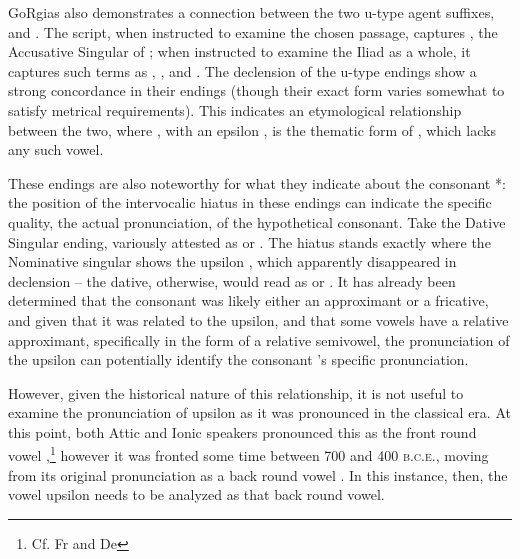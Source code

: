 

GoRgias also demonstrates a connection between the two
u-type agent suffixes,  and . The script, when
instructed to examine the chosen passage, captures , the
Accusative Singular of ; when instructed to examine the
Iliad as a whole, it captures such terms as ,
, and . The declension of the u-type
endings show a strong concordance in their endings (though
their exact form varies somewhat to satisfy metrical requirements).
This indicates an etymological relationship between the two, where
, with an epsilon , is the
thematic form of , which lacks any such vowel. 



These endings are also noteworthy for what they indicate about the
consonant *\w: the position of the intervocalic hiatus in these
endings can indicate the specific quality, the actual pronunciation,
of the hypothetical consonant.
Take the Dative Singular ending, variously attested as 
or . The hiatus stands exactly where the Nominative
singular shows the upsilon , which apparently
disappeared in declension -- the dative, otherwise, would read as
 or . It has already been determined
that the consonant was likely either an approximant or a fricative,
and given that it was related to the upsilon, and that some vowels
have a relative approximant, specifically in the form of a relative
semivowel, the pronunciation of the upsilon
can potentially identify the consonant \w's specific pronunciation.

However, given the historical nature of this relationship, it is not
useful to examine the pronunciation of upsilon  as it was
pronounced in the classical era. At this point, both Attic and
Ionic speakers pronounced this as the front round vowel ,\footnote{Cf. Fr  and De } however it
was fronted some time between 700 and 400 \textsc{b.c.e.}, moving
from its original pronunciation as a back round vowel .\autocite[529]{malikouti-drachman_bortone_2015}
In this instance, then, the vowel upsilon  needs to be
analyzed as that back round vowel. 



